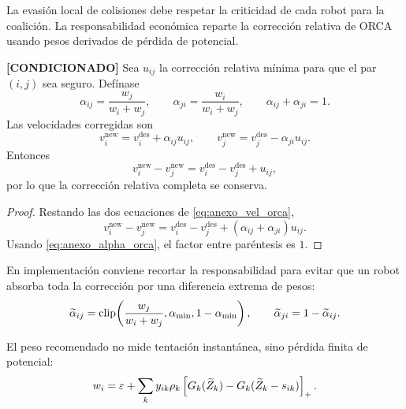 La evasión local de colisiones debe respetar la criticidad de cada robot para la
coalición. La responsabilidad económica reparte la corrección relativa de ORCA usando
pesos derivados de pérdida de potencial.

\begin{proposicion}
\textbf{[CONDICIONADO]}
Sea $u_{ij}$ la corrección relativa mínima para que el par $(i,j)$ sea seguro. Defínase
\begin{equation}
  \alpha_{ij}=\frac{w_j}{w_i+w_j},
  \qquad
  \alpha_{ji}=\frac{w_i}{w_i+w_j},
  \qquad
  \alpha_{ij}+\alpha_{ji}=1.
  \label{eq:anexo_alpha_orca}
\end{equation}
Las velocidades corregidas son
\begin{equation}
  v_i^{\mathrm{new}}=v_i^{\mathrm{des}}+\alpha_{ij}u_{ij},
  \qquad
  v_j^{\mathrm{new}}=v_j^{\mathrm{des}}-\alpha_{ji}u_{ij}.
  \label{eq:anexo_vel_orca}
\end{equation}
Entonces
\begin{equation}
  v_i^{\mathrm{new}}-v_j^{\mathrm{new}}
  =
  v_i^{\mathrm{des}}-v_j^{\mathrm{des}}+u_{ij},
  \label{eq:anexo_rel_orca}
\end{equation}
por lo que la corrección relativa completa se conserva.
\end{proposicion}

\begin{proof}
Restando las dos ecuaciones de \eqref{eq:anexo_vel_orca},
\[
  v_i^{\mathrm{new}}-v_j^{\mathrm{new}}
  =
  v_i^{\mathrm{des}}-v_j^{\mathrm{des}}
  +(\alpha_{ij}+\alpha_{ji})u_{ij}.
\]
Usando \eqref{eq:anexo_alpha_orca}, el factor entre paréntesis es $1$.
\end{proof}

En implementación conviene recortar la responsabilidad para evitar que un robot absorba
toda la corrección por una diferencia extrema de pesos:
\begin{equation}
  \widetilde\alpha_{ij}
  =
  \operatorname{clip}\!\left(
  \frac{w_j}{w_i+w_j},
  \alpha_{\min},
  1-\alpha_{\min}
  \right),
  \qquad
  \widetilde\alpha_{ji}=1-\widetilde\alpha_{ij}.
  \label{eq:anexo_alpha_orca_clip}
\end{equation}

El peso recomendado no mide tentación instantánea, sino pérdida finita de potencial:
\begin{equation}
  w_i=
  \varepsilon+
  \sum_k
  y_{ik}\rho_k
  \left[
    G_k(\widetilde{Z}_k)-G_k(\widetilde{Z}_k-s_{ik})
  \right]_+.
  \label{eq:anexo_peso_orca}
\end{equation}

